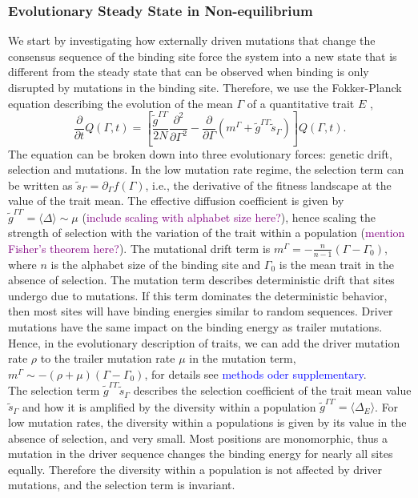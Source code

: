 \documentclass[10pt,a4paper]{article}
\newcommand{\purple}[1]{\textcolor{purple}{#1}}
\begin{document}
	\subsubsection*{Evolutionary Steady State in Non-equilibrium}
	We start by investigating how externally driven mutations that change the consensus sequence of the binding site force the system into a new state that is different from the steady state that can be observed when binding is only disrupted by mutations in the binding site. Therefore, we use the Fokker-Planck equation describing the evolution of the mean $\Gamma$ of a quantitative trait $E$ \cite{nourmohammad2013evolution},
	\begin{equation}
		\frac{\partial}{\partial t}Q(\Gamma,t)=\left[\frac{\tilde{g}^{\Gamma\Gamma}}{2N}\frac{\partial^2}{\partial\Gamma^2}- \frac{\partial}{\partial\Gamma}\left(m^\Gamma+\tilde{g}^{\Gamma\Gamma}\tilde{s}_\Gamma\right)\right]Q(\Gamma,t)\label{equ:trait_diffusion}.
	\end{equation}
	The equation can be broken down into three evolutionary forces: genetic drift, selection and mutations. In the low mutation rate regime, the selection term can be written as $\tilde{s}_\Gamma = \partial_\Gamma f(\Gamma)$, i.e., the derivative of the fitness landscape at the value of the trait mean. The effective diffusion coefficient is given by $\tilde g^{\Gamma\Gamma} = \langle \Delta\rangle \sim \mu$ (\purple{include scaling with alphabet size here?}), hence scaling the strength of selection with the variation of the trait within a population (\purple{mention Fisher's theorem here?}). 
	The mutational drift term is $m^\Gamma = -\frac{n}{n-1} (\Gamma-\Gamma_0)$, where $n$ is the alphabet size of the binding site and $\Gamma_0$ is the mean trait in the absence of selection. 
	The mutation term describes deterministic drift that sites undergo due to mutations. If this term dominates the deterministic behavior, then most sites will have binding energies similar to random sequences. Driver mutations have the same impact on the binding energy as trailer mutations. Hence, in the evolutionary description of traits, we can add the driver mutation rate $\rho$ to the trailer mutation rate $\mu$ in the mutation term, $m^\Gamma\sim-(\rho+\mu)(\Gamma-\Gamma_0)$, for details see \textcolor{blue}{methods oder supplementary}.\\
	The selection term $\tilde{g}^{\Gamma\Gamma}\tilde{s}_\Gamma$ describes the selection coefficient of the trait mean value $\tilde{s}_\Gamma$ and how it is amplified by the diversity within a population $\tilde{g}^{\Gamma\Gamma}=\langle\Delta_E\rangle $. For low mutation rates, the diversity within a populations is given by its value in the absence of selection, and very small. Most positions are monomorphic, thus a mutation in the driver sequence changes the binding energy for nearly all sites equally. Therefore the diversity within a population is not affected by driver mutations, and the selection term is invariant.\\
\end{document}
